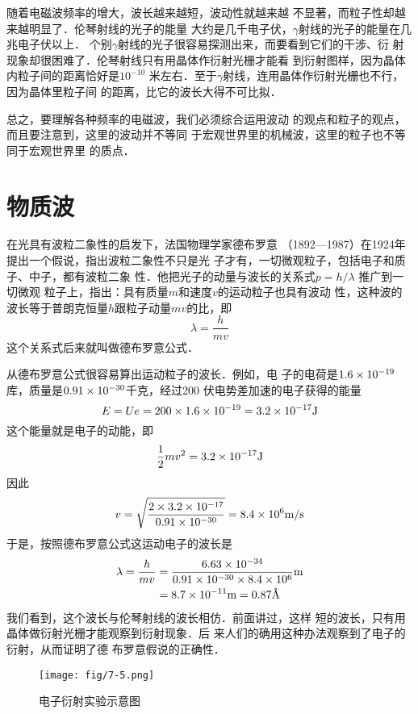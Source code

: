 随着电磁波频率的增大，波长越来越短，波动性就越来越
不显著，而粒子性却越来越明显了．伦琴射线的光子的能量
大约是几千电子伏，$\gamma$射线的光子的能量在几兆电子伏以上．
个别$\gamma$射线的光子很容易探测出来，而要看到它们的干涉、衍
射现象却很困难了．伦琴射线只有用晶体作衍射光栅才能看
到衍射图样，因为晶体内粒子间的距离恰好是$10^{-10}$
米左右．至于$\gamma$射线，连用晶体作衍射光栅也不行，因为晶体里粒子间
的距离，比它的波长大得不可比拟．

总之，要理解各种频率的电磁波，我们必须综合运用波动
的观点和粒子的观点，而且要注意到，这里的波动并不等同
于宏观世界里的机械波，这里的粒子也不等同于宏观世界里
的质点．

\section{物质波}
在光具有波粒二象性的启发下，法国物理学家德布罗意
（1892—1987）在1924年提出一个假说，指出波粒二象性不只是光
子才有，一切微观粒子，包括电子和质子、中子，都有波粒二象
性．他把光子的动量与波长的关系式$p=h/\lambda$
推广到一切微观
粒子上，指出：具有质量$m$和速度$v$的运动粒子也具有波动
性，这种波的波长等于普朗克恒量$h$跟粒子动量$mv$的比，即
\[\lambda=\frac{h}{mv} \]
这个关系式后来就叫做德布罗意公式．

从德布罗意公式很容易算出运动粒子的波长．例如，电
子的电荷是$1.6\times10^{-19}$
库，质量是$0.91\times10^{-30}$千克，经过200
伏电势差加速的电子获得的能量
\[E=Ue=200\times1.6\times10^{-19}=3.2\times10^{-17}{\rm J}\]
这个能量就是电子的动能，即
\[\dfrac{1}{2}mv^2=3.2\times10^{-17}{\rm J} \]
因此
\[v=\sqrt{\frac{2\times 3.2\times10^{-17}}{0.91\times 10^{-30}}}=8.4\times10^6\text{m}/\text{s} \]
于是，按照德布罗意公式这运动电子的波长是
\[\begin{split}
    \lambda=\dfrac{h}{mv}&=\frac{6.63\times 10^{-34}}{0.91\times10^{-30}\times8.4\times 10^6}{\rm m} \\
&=8.7\times10^{-11}{\rm m}=0.87\text{\AA}
\end{split}\]
我们看到，这个波长与伦琴射线的波长相仿．前面讲过，这样
短的波长，只有用晶体做衍射光栅才能观察到衍射现象．后
来人们的确用这种办法观察到了电子的衍射，从而证明了德
布罗意假说的正确性．
\begin{figure}[htp]\centering
    \texttt{[image: fig/7-5.png]}
    \caption{电子衍射实验示意图}
    \end{figure}

